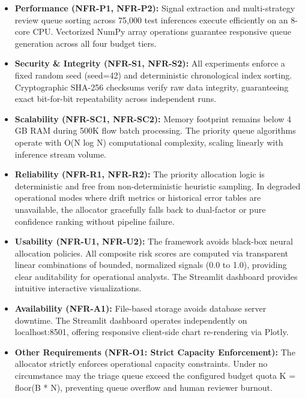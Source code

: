 \begin{itemize}
\item \textbf{Performance (NFR-P1, NFR-P2):} Signal extraction and multi-strategy review queue sorting across 75,000 test inferences execute efficiently on an 8-core CPU. Vectorized NumPy array operations guarantee responsive queue generation across all four budget tiers.
\item \textbf{Security \& Integrity (NFR-S1, NFR-S2):} All experiments enforce a fixed random seed (seed=42) and deterministic chronological index sorting. Cryptographic SHA-256 checksums verify raw data integrity, guaranteeing exact bit-for-bit repeatability across independent runs.
\item \textbf{Scalability (NFR-SC1, NFR-SC2):} Memory footprint remains below 4 GB RAM during 500K flow batch processing. The priority queue algorithms operate with O(N log N) computational complexity, scaling linearly with inference stream volume.
\item \textbf{Reliability (NFR-R1, NFR-R2):} The priority allocation logic is deterministic and free from non-deterministic heuristic sampling. In degraded operational modes where drift metrics or historical error tables are unavailable, the allocator gracefully falls back to dual-factor or pure confidence ranking without pipeline failure.
\item \textbf{Usability (NFR-U1, NFR-U2):} The framework avoids black-box neural allocation policies. All composite risk scores are computed via transparent linear combinations of bounded, normalized signals (0.0 to 1.0), providing clear auditability for operational analysts. The Streamlit dashboard provides intuitive interactive visualizations.
\item \textbf{Availability (NFR-A1):} File-based storage avoids database server downtime. The Streamlit dashboard operates independently on localhost:8501, offering responsive client-side chart re-rendering via Plotly.
\item \textbf{Other Requirements (NFR-O1: Strict Capacity Enforcement):} The allocator strictly enforces operational capacity constraints. Under no circumstance may the triage queue exceed the configured budget quota K = floor(B * N), preventing queue overflow and human reviewer burnout.
\end{itemize}

